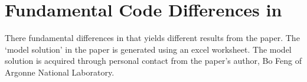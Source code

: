 

\section{Fundamental Code Differences in \Cyclus}
There fundamental differences in \Cyclus that yields
different results from the paper. The `model solution'
in the paper is generated using an excel worksheet.
The model solution is acquired through personal contact
from the paper's author, Bo Feng of Argonne National
Laboratory.